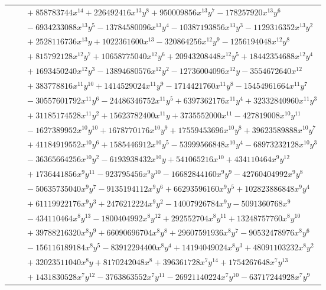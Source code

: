 \documentclass[11pt]{article}
\begin{document}
\begin{longtable}{@{}ll@{}}
 & $\quad +858783744x^{14}+226492416x^{13}y^{8}+950009856x^{13}y^{7}-178257920x^{13}y^{6}$\\
 & $\quad -6934233088x^{13}y^{5}-13784580096x^{13}y^{4}-10387193856x^{13}y^{3}-1129316352x^{13}y^{2}$\\
 & $\quad +2528116736x^{13}y+1022361600x^{13}-320864256x^{12}y^{9}-1256194048x^{12}y^{8}$\\
 & $\quad +815792128x^{12}y^{7}+10658775040x^{12}y^{6}+20943208448x^{12}y^{5}+18442354688x^{12}y^{4}$\\
 & $\quad +1693450240x^{12}y^{3}-13894680576x^{12}y^{2}-12736004096x^{12}y-3554672640x^{12}$\\
 & $\quad +383778816x^{11}y^{10}+1414529024x^{11}y^{9}-1714421760x^{11}y^{8}-15454961664x^{11}y^{7}$\\
 & $\quad -30557601792x^{11}y^{6}-24486346752x^{11}y^{5}+6397362176x^{11}y^{4}+32332840960x^{11}y^{3}$\\
 & $\quad +31185174528x^{11}y^{2}+15623782400x^{11}y+3735552000x^{11}-427819008x^{10}y^{11}$\\
 & $\quad -1627389952x^{10}y^{10}+1678770176x^{10}y^{9}+17559453696x^{10}y^{8}+39623589888x^{10}y^{7}$\\
 & $\quad +41184919552x^{10}y^{6}+1585446912x^{10}y^{5}-53999566848x^{10}y^{4}-68973232128x^{10}y^{3}$\\
 & $\quad -36365664256x^{10}y^{2}-6193938432x^{10}y+541065216x^{10}+434110464x^{9}y^{12}$\\
 & $\quad +1736441856x^{9}y^{11}-923795456x^{9}y^{10}-16682844160x^{9}y^{9}-42760404992x^{9}y^{8}$\\
 & $\quad -50635735040x^{9}y^{7}-9135194112x^{9}y^{6}+66293596160x^{9}y^{5}+102823886848x^{9}y^{4}$\\
 & $\quad +61119922176x^{9}y^{3}+2476212224x^{9}y^{2}-14007926784x^{9}y-5091360768x^{9}$\\
 & $\quad -434110464x^{8}y^{13}-1800404992x^{8}y^{12}+292552704x^{8}y^{11}+13248757760x^{8}y^{10}$\\
 & $\quad +39788216320x^{8}y^{9}+66090696704x^{8}y^{8}+29607591936x^{8}y^{7}-90532478976x^{8}y^{6}$\\
 & $\quad -156116189184x^{8}y^{5}-83912294400x^{8}y^{4}+14194049024x^{8}y^{3}+48091103232x^{8}y^{2}$\\
 & $\quad +32023511040x^{8}y+8170242048x^{8}+396361728x^{7}y^{14}+1754267648x^{7}y^{13}$\\
 & $\quad +1431830528x^{7}y^{12}-3763863552x^{7}y^{11}-26921140224x^{7}y^{10}-63717244928x^{7}y^{9}$\\

\end{longtable}
\end{document}
